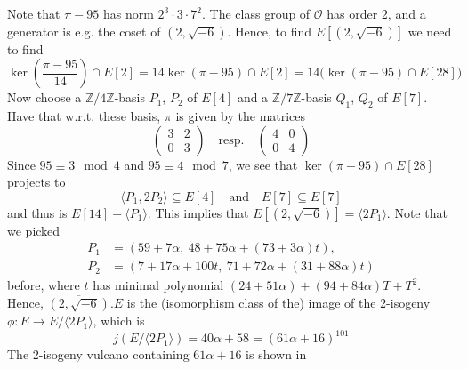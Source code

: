 \documentclass{scrartcl}
\newcommand{\Z}{\mathbb{Z}}
\renewcommand{\O}{\mathcal{O}}
\theoremstyle{definition}
\begin{document}
Note that $\pi - 95$ has norm $2^3 \cdot 3 \cdot 7^2$.
The class group of $\O$ has order 2, and a generator is e.g. the coset of $(2, \sqrt{-6})$.
Hence, to find $E[(2, \sqrt{-6})]$ we need to find
\begin{equation*}
    \ker\left( \frac {\pi - 95} {14} \right) \cap E[2] = 14\ker(\pi - 95) \cap E[2] = 14 \bigl( \ker(\pi - 95) \cap E[28] \bigr)
\end{equation*}
Now choose a $\Z/4\Z$-basis $P_1$, $P_2$ of $E[4]$ and a $\Z/7\Z$-basis $Q_1$, $Q_2$ of $E[7]$.
Have that w.r.t. these basis, $\pi$ is given by the matrices
\begin{equation*}
    \left(\begin{matrix*}
        3 & 2 \\ 0 & 3
    \end{matrix*}\right) \quad \text{resp.} \quad \left(\begin{matrix*}
        4 & 0 \\ 0 & 4
    \end{matrix*}\right)
\end{equation*}
Since $95 \equiv 3 \mod 4$ and $95 \equiv 4 \mod 7$, we see that $\ker(\pi - 95) \cap E[28]$ projects to
\begin{equation*}
    \langle P_1, 2P_2 \rangle \subseteq E[4] \quad \text{and} \quad E[7] \subseteq E[7]
\end{equation*}
and thus is $E[14] + \langle P_1 \rangle$.
This implies that $E[(2, \sqrt{-6})] = \langle 2P_1 \rangle$.
Note that we picked
\begin{align*}
    P_1 &= (59 + 7\alpha, \ 48 + 75\alpha + (73 + 3\alpha)t), \\
    P_2 &= (7 + 17\alpha + 100t, \ 71 + 72\alpha + (31 + 88\alpha)t)
\end{align*}
before, where $t$ has minimal polynomial $(24 + 51\alpha) + (94 + 84\alpha) T + T^2$.
Hence, $\overline{(2, \sqrt{-6})}.E$ is the (isomorphism class of the) image of the 2-isogeny $\phi: E \to E/\langle 2P_1 \rangle$, which is
\begin{equation*}
    j(E/\langle 2P_1 \rangle) = 40\alpha + 58 = (61\alpha + 16)^{101}
\end{equation*}
The 2-isogeny vulcano containing $61\alpha + 16$ is shown in 
\end{document}
